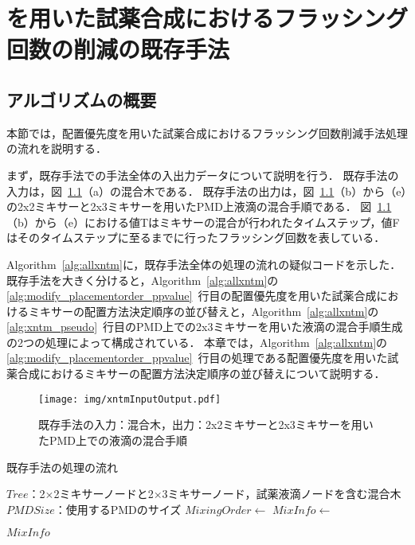 \chapter{を用いた試薬合成におけるフラッシング回数の削減の既存手法}\label{sec:existing}

\section{アルゴリズムの概要}
本節では，配置優先度を用いた試薬合成におけるフラッシング回数削減手法処理の流れを説明する．

まず，既存手法での手法全体の入出力データについて説明を行う．
既存手法の入力は，図~\ref{fig:xntm}（a）の混合木である．
既存手法の出力は，図~\ref{fig:xntm}（b）から（e）の2x2ミキサーと2x3ミキサーを用いたPMD上液滴の混合手順である．
図~\ref{fig:xntm}（b）から（e）における値Tはミキサーの混合が行われたタイムステップ，値Fはそのタイムステップに至るまでに行ったフラッシング回数を表している．

Algorithm~\ref{alg:allxntm}に，既存手法全体の処理の流れの疑似コードを示した．
既存手法を大きく分けると，Algorithm~\ref{alg:allxntm}の\ref{alg:modify_placementorder_ppvalue}~行目の配置優先度を用いた試薬合成におけるミキサーの配置方法決定順序の並び替えと，Algorithm~\ref{alg:allxntm}の\ref{alg:xntm_pseudo}~行目のPMD上での2x3ミキサーを用いた液滴の混合手順生成の2つの処理によって構成されている．
本章では，Algorithm~\ref{alg:allxntm}の\ref{alg:modify_placementorder_ppvalue}~行目の処理である配置優先度を用いた試薬合成におけるミキサーの配置方法決定順序の並び替えについて説明する．

\begin{figure}[tbp]
 \centering\texttt{[image: img/xntmInputOutput.pdf]}
 \caption{既存手法の入力：混合木，出力：2x2ミキサーと2x3ミキサーを用いたPMD上での液滴の混合手順}\label{fig:xntm}
\end{figure}


\begin{algorithm}[tbp]
 \caption{既存手法の処理の流れ}\label{alg:allxntm}
 \begin{algorithmic}[1]
     \Require $\mathit{Tree}$：2$\times$2ミキサーノードと2$\times$3ミキサーノード，試薬液滴ノードを含む混合木
     \Require $\mathit{PMDSize}$：使用するPMDのサイズ
     \State $\mathit{MixingOrder} \gets$  \label{alg:modify_placementorder_ppvalue}
     \State $\mathit{MixInfo \gets}$  \label{alg:xntm_pseudo}

      \Return $\mathit{MixInfo}$
 \end{algorithmic}
\end{algorithm}

